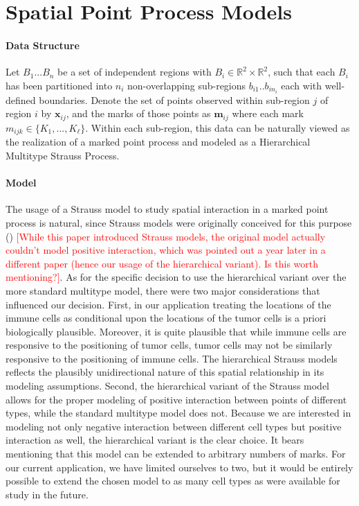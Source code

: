 \documentclass[
]{book}
\begin{document}
\hypertarget{spatial-point-process-models}{%
\section{Spatial Point Process Models}\label{spatial-point-process-models}}

\paragraph{\textbf{Data Structure}}

Let \(B_1...B_n\) be a set of independent regions with \(B_i \in \mathbb{R}^2 \times \mathbb{R}^2\), such that each \(B_i\) has been partitioned into \(n_i\) non-overlapping sub-regions \(b_{i1}..b_{in_i}\) each with well-defined boundaries. Denote the set of points observed within sub-region \(j\) of region \(i\) by \({\mathbf{x}}_{ij}\), and the marks of those points as \({\mathbf{m}}_{ij}\) where each mark \(m_{ijk} \in \{K_1,...,K_\ell\}\). Within each sub-region, this data can be naturally viewed as the realization of a marked point process and modeled as a Hierarchical Multitype Strauss Process.

\paragraph{\textbf{Model}}

The usage of a Strauss model to study spatial interaction in a marked point process is natural, since Strauss models were
originally conceived for this purpose
(\citet{Strauss75}) \textcolor{red}{\textsf{[While this paper introduced Strauss models, the original model actually couldn't model positive interaction, which was pointed out a year later in a different paper (hence our usage of the hierarchical variant). Is this worth mentioning?]}}. As for the specific decision to use
the hierarchical variant over the more standard multitype model,
there were two major considerations that influenced our decision.
First, in our application treating the locations of the immune cells as conditional
upon the locations of the tumor cells is a priori biologically
plausible. Moreover, it is quite plausible that while
immune cells are responsive to the positioning of tumor cells, tumor
cells may not be similarly responsive to the positioning of
immune cells. The hierarchical Strauss models reflects the
plausibly unidirectional nature of this spatial relationship in its
modeling assumptions. Second, the hierarchical variant of the
Strauss model allows for the proper modeling of positive
interaction between points of different types, while the standard
multitype model does not. Because we are interested in modeling not only negative interaction between different cell types but positive interaction as well, the hierarchical variant is the clear choice. It bears mentioning that this model
can be extended to arbitrary numbers of marks. For our current
application, we have limited ourselves to two, but it would
be entirely possible to extend the chosen model to as many
cell types as were available for study in the future.
\end{document}
